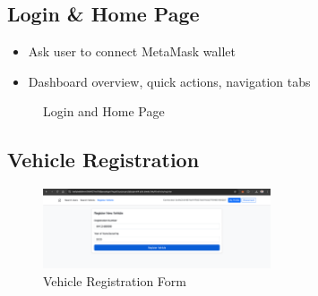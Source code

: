 \documentclass[12pt,a4paper]{article}
\begin{document}
    \subsection{Login \& Home Page}
    \begin{itemize}
        \item Ask user to connect MetaMask wallet
        \item Dashboard overview, quick actions, navigation tabs
    \end{itemize}
    \begin{figure}[H]
        \centering
        \quad
        \caption{Login and Home Page}
        \label{fig:login-home}
    \end{figure}

    \subsection{Vehicle Registration}
    \begin{figure}[H]
        \centering
        \includegraphics[width=0.6\textwidth]{screenshots/register vehicle.png}
        \caption{Vehicle Registration Form}
        \label{fig:registration}
    \end{figure}
\end{document}
